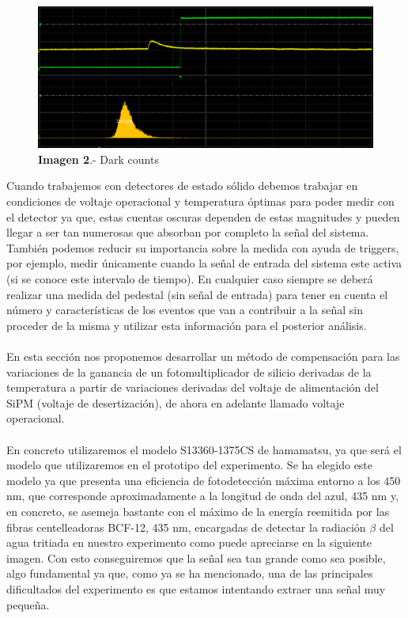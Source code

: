 \documentclass[11pt, a4paper]{article}
\begin{document}
\begin{figure}[hbtp]
\centering
\includegraphics[scale=0.2]{pedestal.png}
\caption{\textbf{Imagen 2}.- Dark counts}
\end{figure}


Cuando trabajemos con detectores de estado sólido debemos trabajar en condiciones de voltaje operacional y temperatura óptimas para poder medir con el detector ya  que, estas cuentas oscuras dependen de estas magnitudes y pueden llegar a ser tan numerosas que absorban por completo la señal del sistema. También podemos reducir su importancia sobre la medida con ayuda de triggers, por ejemplo, medir únicamente cuando la señal de entrada del sistema este activa (si se conoce este intervalo de tiempo). En cualquier caso siempre se deberá realizar una medida del pedestal (sin señal de entrada) para tener en cuenta el número y características de los eventos que van a contribuir a la señal sin proceder de la misma y utilizar esta información para el posterior análisis. 

\paragraph {}
En esta sección nos proponemos desarrollar un método de compensación para las variaciones de la ganancia de un fotomultiplicador de silicio derivadas de la temperatura a partir de variaciones derivadas del voltaje de alimentación del SiPM (voltaje de desertización), de ahora en adelante llamado voltaje operacional. 

\paragraph {} 
En concreto utilizaremos el modelo S13360-1375CS de hamamatsu, ya que será el modelo que utilizaremos en el prototipo del experimento. Se ha elegido este modelo ya que presenta una eficiencia de fotodetección máxima entorno a los 450 nm, que corresponde aproximadamente a la longitud de onda del azul, 435 nm y, en concreto, se asemeja bastante con el máximo de la energía reemitida por las fibras centelleadoras BCF-12, 435 nm, encargadas de detectar la radiación $\beta$ del agua tritiada en nuestro experimento como puede apreciarse en la siguiente imagen. Con esto conseguiremos que la señal sea tan grande como sea posible, algo fundamental ya que, como ya se ha mencionado, una de las principales dificultados del experimento es que estamos intentando extraer una señal muy pequeña.
\end{document}
